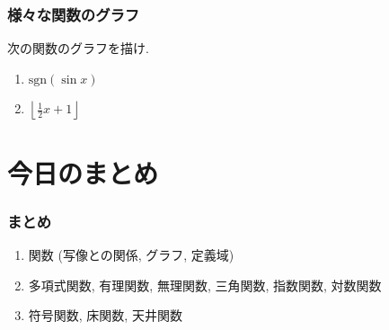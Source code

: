



\begin{frame}
\frametitle{様々な関数のグラフ}   

\begin{Prob}
次の関数のグラフを描け. 
\begin{enumerate}
\item $\mathrm{sgn}(\sin x)$
\item $\left \lfloor{\frac{1}{2}x+1}\right \rfloor $
\end{enumerate}
\end{Prob}

\end{frame}







\section{今日のまとめ}
\begin{frame}
\frametitle{まとめ}   


\begin{enumerate}
\item 関数 (写像との関係, グラフ, 定義域)
\item 多項式関数, 有理関数, 無理関数, 三角関数, 指数関数, 対数関数
\item 符号関数, 床関数, 天井関数
\end{enumerate} 


\end{frame}
